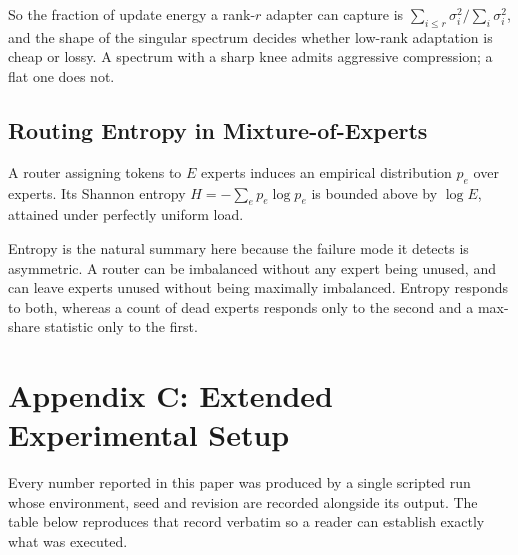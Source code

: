 \documentclass[10pt,journal,compsoc,twocolumn]{IEEEtran}
\begin{document}
So the fraction of update energy a rank-$r$ adapter can capture is $\sum_{i \le r} \sigma_i^2 / \sum_i \sigma_i^2$, and the shape of the singular spectrum decides whether low-rank adaptation is cheap or lossy. A spectrum with a sharp knee admits aggressive compression; a flat one does not.


\subsection{Routing Entropy in Mixture-of-Experts}


A router assigning tokens to $E$ experts induces an empirical distribution $p_e$ over experts. Its Shannon entropy $H = -\sum_e p_e \log p_e$ is bounded above by $\log E$, attained under perfectly uniform load.

Entropy is the natural summary here because the failure mode it detects is asymmetric. A router can be imbalanced without any expert being unused, and can leave experts unused without being maximally imbalanced. Entropy responds to both, whereas a count of dead experts responds only to the second and a max-share statistic only to the first.




\section{Appendix C: Extended Experimental Setup}


Every number reported in this paper was produced by a single scripted run whose environment, seed and revision are recorded alongside its output. The table below reproduces that record verbatim so a reader can establish exactly what was executed.
\begin{table}[htbp]
\centering
{}
\end{table}
\end{document}
